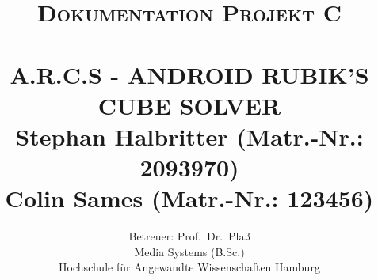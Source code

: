 

\title{\normalsize \textsc{Dokumentation Projekt C} 	%
		 	\\[2.0cm]													%
            \HRule{0.5pt} \\ [0.5cm]										%
			\LARGE \textbf{\uppercase{A.R.C.S - Android Rubik's Cube Solver}}	%
			\HRule{0.5pt} \\ [0.5cm]								%
			\large Stephan Halbritter (Matr.-Nr.: 2093970)\\
      Colin Sames (Matr.-Nr.: 123456)\\
		}

\author{Betreuer: Prof.~Dr.~Plaß\\
    Media Systems (B.Sc.)\\
    Hochschule für Angewandte Wissenschaften Hamburg\\
}
